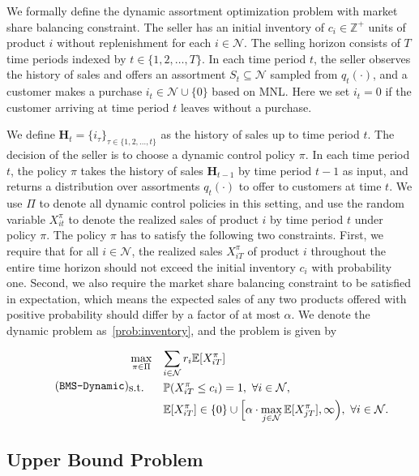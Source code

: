 \documentclass[mnsc,non-blindrev]{informs3}
\theoremstyle{definition}
\begin{document}
We formally define the dynamic assortment optimization problem with market share balancing constraint. The seller has an initial inventory of $c_i\in\mathbb{Z}^+$ units of product $i$ without replenishment for each $i\in\mathcal{N}$. The selling horizon consists of $T$ time periods indexed by \mbox{$t\in\{1,2,\dots,T\}$.} In each time period $t$, the seller observes the history of sales and offers an assortment $S_t\subseteq\mathcal{N}$ sampled from $q_t(\cdot)$, and a customer makes a purchase $i_t\in\mathcal{N}\cup\{0\}$ based on MNL. Here we set $i_t=0$ if the customer arriving at time period $t$ leaves without a purchase.

We define $\bm{H}_t=\{i_\tau\}_{\tau\in\{1,2,\dots,t\}}$ as the history of sales up to time period $t$. The decision of the seller is to choose a dynamic control policy $\pi$. In each time period $t$, the policy $\pi$ takes the history of sales $\bm{H}_{t-1}$ by time period $t-1$ as input, and returns a distribution over assortments $q_t(\cdot)$ to offer to customers at time $t$.  We use $\Pi$ to denote all dynamic control policies in this setting, and use the random variable $X_{it}^\pi$ to denote the realized sales of product $i$ by time period $t$ under policy $\pi$. The policy $\pi$ has to satisfy the following two constraints. First, we require that for all $i\in\mathcal{N}$, the realized sales $X_{iT}^\pi$ of product $i$ throughout the entire time horizon should not exceed the initial inventory $c_i$ with probability one. Second, we also require the market share balancing constraint to be satisfied in expectation, which means the expected sales of any two products offered with positive probability should differ by a factor of at most $\alpha$. We denote the dynamic problem as~\ref{prob:inventory}, and the problem is given by

\begin{equation}\label{prob:inventory}
\tag{\texttt{BMS-Dynamic}}
\begin{aligned}
&\max_{\pi\in\Pi}&&{\sum_{i\in\mathcal{N}}r_i\mathbb{E}[X_{iT}^\pi]}\\
&\text{s.t.}&&{\mathbb{P}(X_{iT}^\pi\leq c_i)=1,\ \forall i\in\mathcal{N},}\\
&&&{\mathbb{E}[X_{iT}^\pi]\in\{0\}\cup \Big[\alpha\cdot \max_{j\in\mathcal{N}}\mathbb{E}[X_{jT}^\pi],\infty\Big),\ \forall i\in\mathcal{N}.}
\end{aligned}
\end{equation}

\subsection{Upper Bound Problem}\label{sec:upper_bound}
\end{document}
